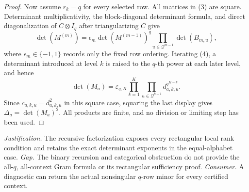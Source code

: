 \documentclass{article}
\begin{document}
\begin{proof}
Now assume \(r_k=q\) for every selected row.  All matrices in (3) are square.  Determinant multiplicativity, the block-diagonal determinant formula, and direct diagonalization of \(C\otimes I_q\) after triangularizing \(C\) give
\[
 \det(M^{(m)})=\epsilon_m\det(M^{(m-1)})^q
 \prod_{u\in\mathcal Q^{m-1}}\det(B_{m,u}),
\tag{4}
\]
where \(\epsilon_m\in\{-1,1\}\) records only the fixed row ordering.  Iterating (4), a determinant introduced at level \(k\) is raised to the \(q\)-th power at each later level, and hence
\[
 \det(M_a)=\varepsilon_{q,K}
 \prod_{k=1}^K\prod_{u\in\mathcal Q^{k-1}}
 d_{a,k,u}^{q^{K-k}}.
\]
Since \(c_{a,k,u}=d_{a,k,u}^2\) in this square case, squaring the last display gives \(\Delta_a=\det(M_a)^2\).  All products are finite, and no division or limiting step has been used.
\end{proof}
\par\smallskip\noindent \textit{Justification.} The recursive factorization exposes every rectangular local rank condition and retains the exact determinant exponents in the equal-alphabet case. \textit{Gap.} The binary recursion and categorical obstruction do not provide the all-\(q\), all-context Gram formula or its rectangular sufficiency proof. \textit{Consumer.} A diagnostic can return the actual nonsingular \(q\)-row minor for every certified context.
\end{document}
